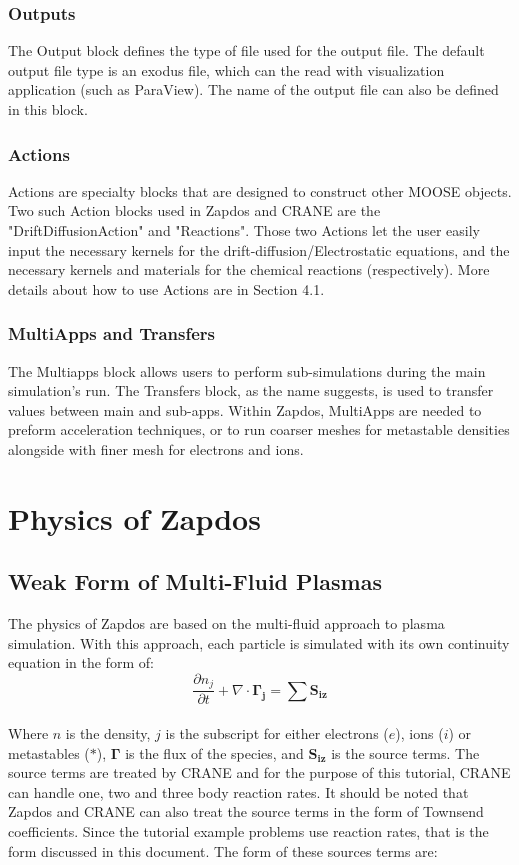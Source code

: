 \documentclass[final]{report}
\begin{document}
  \subsection{Outputs}
  The Output block defines the type of file used for the output file. The default output file type is an exodus file, which can the read with visualization application (such as ParaView). The name of the output file can also be defined in this block.
  \subsection{Actions}
  Actions are specialty blocks that are designed to construct other MOOSE objects. Two such Action blocks used in Zapdos and CRANE are the "DriftDiffusionAction" and "Reactions". Those two Actions let the user easily input the necessary kernels for the drift-diffusion/Electrostatic equations, and the necessary kernels and materials for the chemical reactions (respectively). More details about how to use Actions are in Section 4.1.
  \subsection{MultiApps and Transfers}
  The Multiapps block allows users to perform sub-simulations during the main simulation's run. The Transfers block, as the name suggests, is used to transfer values between main and sub-apps. Within Zapdos, MultiApps are needed to preform acceleration techniques, or to run coarser meshes for metastable densities alongside with finer mesh for electrons and ions.

  \chapter{Physics of Zapdos} \label{chapter3}
  \section{Weak Form of Multi-Fluid Plasmas}
  The physics of Zapdos are based on the multi-fluid approach to plasma simulation. With this approach, each particle is simulated with its own continuity equation in the form of:
  \begin{equation}
      \frac{\partial n_{j}}{\partial t}+\nabla\cdot\mathbf{\Gamma_{j}}=\sum{\mathbf{S_{iz}}}
  \end{equation}
  \\
  Where $n$ is the density, $j$ is the subscript for either electrons ($e$), ions ($i$) or metastables ($*$), $\mathbf{\Gamma}$ is the flux of the species, and $\mathbf{S_{iz}}$ is the source terms. The source terms are treated by CRANE and for the purpose of this tutorial, CRANE can handle one, two and three body reaction rates. It should be noted that Zapdos and CRANE can also treat the source terms in the form of Townsend coefficients. Since the tutorial example problems use reaction rates, that is the form discussed in this document. The form of these sources terms are:
\end{document}

